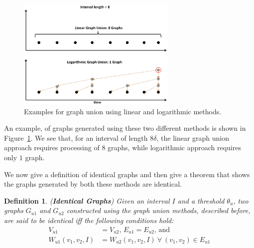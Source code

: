 \documentclass{sig-alternate}
\newtheorem{definition}{Definition}[section]
\begin{document}
\begin{figure}[!t]
\begin{center}
\includegraphics[width=3.0in]{images/graph_union_example}
\caption{Examples for graph union using linear and logarithmic methods.}
\label{fig:graph_union_example}
\end{center}
\end{figure}

\medskip An example, of graphs generated using these two different methods is shown in Figure~\ref{fig:graph_union_example}. We see that, for an interval of length $8\delta$, the linear graph union approach requires processing of 8 graphs, while logarithmic approach requires only $1$ graph.

\medskip We now give a definition of identical graphs and then give a theorem that shows the graphs generated by both these methods are identical.

\begin{definition} (\textbf{Identical Graphs})
Given an interval $I$ and a threshold $\theta_u$,  two graphs $G_{u1}$ and $G_{u2}$ constructed using the graph union methods, described before, are said to be identical iff the following conditions hold:
\begin{align*}
V_{u1} &= V_{u2} \text{, } E_{u1} = E_{u2} \text{, and}\\
W_{u1}(v_1, v_2, I) &=  W_{u2}(v_1, v_2, I)\ \forall\ (v_1, v_2) \in E_{u1}
\end{align*}
\end{definition}
\end{document}
